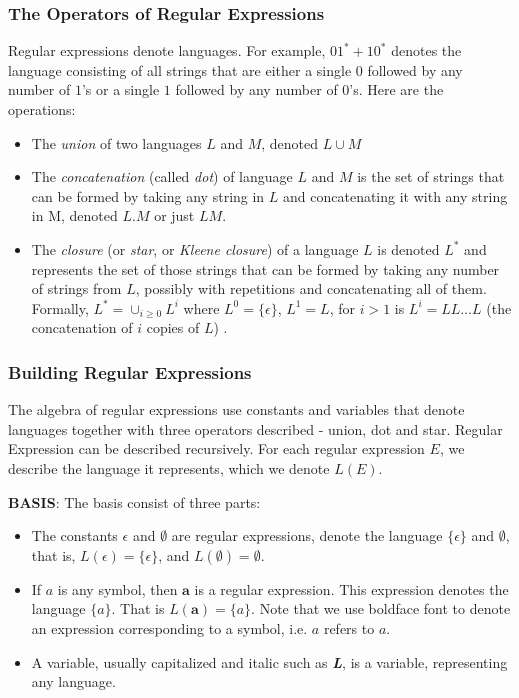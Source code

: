 \documentclass[12pt,reqno]{amsart}
\begin{document}
\subsubsection{The Operators of Regular Expressions}
Regular expressions denote languages. For example, \textbf{$01^*+10^*$} denotes the language consisting of all strings that are either a single $0$ followed by any number of $1$'s or a single $1$ followed by any number of $0$'s. Here are the operations:
\begin{itemize}
	\item The \textit{union} of two languages $L$ and $M$, denoted $L\cup M$
	\item The \textit{concatenation} (called \textit{dot}) of language $L$ and $M$ is the set of strings that can be formed by taking any string in $L$ and concatenating it with any string in M, denoted $L.M$ or just $LM$.	
	\item The \textit{closure} (or \textit{star}, or \textit{Kleene closure}) of a language $L$ is denoted $L^*$ and represents the set of those strings that can be formed by taking any number of strings from $L$, possibly with repetitions and concatenating all of them. Formally, $L^* = \cup_{i\geq 0}L^i$ where $L^0 = \{ \epsilon\}$, $L^1 = L$, for $i > 1$ is $L^i = LL\ldots L$ (the concatenation of $i$ copies of $L$) .
	
\end{itemize}


\subsubsection{Building Regular Expressions}
The algebra of regular expressions use constants and variables that denote languages together with three operators described - union, dot and star. Regular Expression can be described recursively. For each regular expression $E$, we describe the language it represents, which we denote $L(E)$.

\textbf{BASIS}: The basis consist of three parts:
\begin{itemize}
	\item The constants $\epsilon$ and $\emptyset$ are regular expressions, denote the language $\{\epsilon\}$ and $\emptyset$, that is, $L(\epsilon) = \{\epsilon\}$, and $L(\emptyset) = \emptyset$.
	\item If $a$ is any symbol, then $\textbf{a}$ is a regular expression. This expression denotes the language $\{a\}$. That is $L(\textbf{a}) = \{ a \}$. Note that we use boldface font to denote an expression corresponding to a symbol, i.e. \textbf{$a$} refers to $a$.
	\item A variable, usually capitalized and italic such as \textit{\textbf{L}}, is a variable, representing any language.
\end{itemize}
\end{document}
